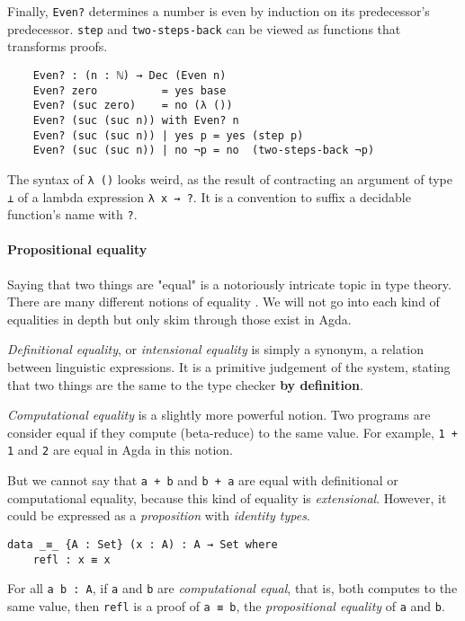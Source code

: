 \documentclass[12pt, a4paper]{article}
\begin{document}
Finally, {\lstinline|Even?|} determines a number is even by induction on its
predecessor's predecessor. {\lstinline|step|} and {\lstinline|two-steps-back|}
can be viewed as functions that transforms proofs.

\begin{lstlisting}
    Even? : (n : ℕ) → Dec (Even n)
    Even? zero          = yes base
    Even? (suc zero)    = no (λ ())
    Even? (suc (suc n)) with Even? n
    Even? (suc (suc n)) | yes p = yes (step p)
    Even? (suc (suc n)) | no ¬p = no  (two-steps-back ¬p)
\end{lstlisting}

The syntax of {\lstinline|λ ()|} looks weird, as the result of contracting
an argument of type {\lstinline|⊥|} of a lambda expression {\lstinline|λ x → ?|}.
It is a convention to suffix a decidable function's name with {\lstinline|?|}.

\paragraph{Propositional equality}

Saying that two things are "equal" is a notoriously intricate topic in type theory.
There are many different notions of equality
\cite{equality}. We will not go
into each kind of equalities in depth but only skim through those exist in Agda.

\textit{Definitional equality}, or \textit{intensional equality} is simply a
synonym, a relation between linguistic expressions. It is a primitive judgement
of the system, stating that two things are the same to the type checker
\textbf{by definition}.

\textit{Computational equality} is a slightly more powerful notion.
Two programs are consider equal if they compute (beta-reduce) to the same value.
For example, {\lstinline|1 + 1|} and {\lstinline|2|} are equal in Agda in this notion.

But we cannot say that {\lstinline|a + b|} and {\lstinline|b + a|}
are equal with definitional or computational equality, because this kind of equality
is \textit{extensional}. However, it could be expressed as a \textit{proposition}
with \textit{identity types}.

\begin{lstlisting}
data _≡_ {A : Set} (x : A) : A → Set where
    refl : x ≡ x
\end{lstlisting}

For all {\lstinline|a b : A|}, if {\lstinline|a|} and {\lstinline|b|} are
\textit{computational equal}, that is, both computes to the same value,
then {\lstinline|refl|} is a proof of {\lstinline|a ≡ b|},
the \textit{propositional equality} of {\lstinline|a|} and {\lstinline|b|}.
\end{document}
